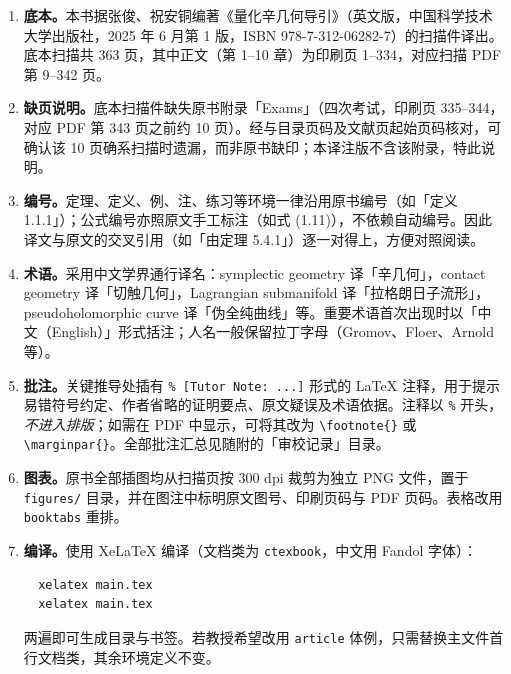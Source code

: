 \begin{enumerate}[label=（\arabic*）,leftmargin=3em]
  \item \textbf{底本。}本书据张俊、祝安铜编著《量化辛几何导引》（英文版，中国科学技术大学出版社，2025 年 6 月第 1 版，ISBN 978-7-312-06282-7）的扫描件译出。底本扫描共 363 页，其中正文（第 1--10 章）为印刷页 1--334，对应扫描 PDF 第 9--342 页。

  \item \textbf{缺页说明。}底本扫描件缺失原书附录「Exams」（四次考试，印刷页 335--344，对应 PDF 第 343 页之前约 10 页）。经与目录页码及文献页起始页码核对，可确认该 10 页确系扫描时遗漏，而非原书缺印；本译注版不含该附录，特此说明。

  \item \textbf{编号。}定理、定义、例、注、练习等环境一律沿用原书编号（如「定义 1.1.1」）；公式编号亦照原文手工标注（如式 (1.11)），不依赖自动编号。因此译文与原文的交叉引用（如「由定理 5.4.1」）逐一对得上，方便对照阅读。

  \item \textbf{术语。}采用中文学界通行译名：symplectic geometry 译「辛几何」，contact geometry 译「切触几何」，Lagrangian submanifold 译「拉格朗日子流形」，pseudoholomorphic curve 译「伪全纯曲线」等。重要术语首次出现时以「中文（English）」形式括注；人名一般保留拉丁字母（Gromov、Floer、Arnold 等）。

  \item \textbf{批注。}关键推导处插有 \texttt{\% [Tutor Note: ...]} 形式的 LaTeX 注释，用于提示易错符号约定、作者省略的证明要点、原文疑误及术语依据。注释以 \texttt{\%} 开头，\emph{不进入排版}；如需在 PDF 中显示，可将其改为 \verb|\footnote{}| 或 \verb|\marginpar{}|。全部批注汇总见随附的「审校记录」目录。

  \item \textbf{图表。}原书全部插图均从扫描页按 300 dpi 裁剪为独立 PNG 文件，置于 \texttt{figures/} 目录，并在图注中标明原文图号、印刷页码与 PDF 页码。表格改用 \texttt{booktabs} 重排。

  \item \textbf{编译。}使用 XeLaTeX 编译（文档类为 \texttt{ctexbook}，中文用 Fandol 字体）：
  \begin{verbatim}
  xelatex main.tex
  xelatex main.tex
  \end{verbatim}
  两遍即可生成目录与书签。若教授希望改用 \texttt{article} 体例，只需替换主文件首行文档类，其余环境定义不变。
\end{enumerate}

\clearpage

